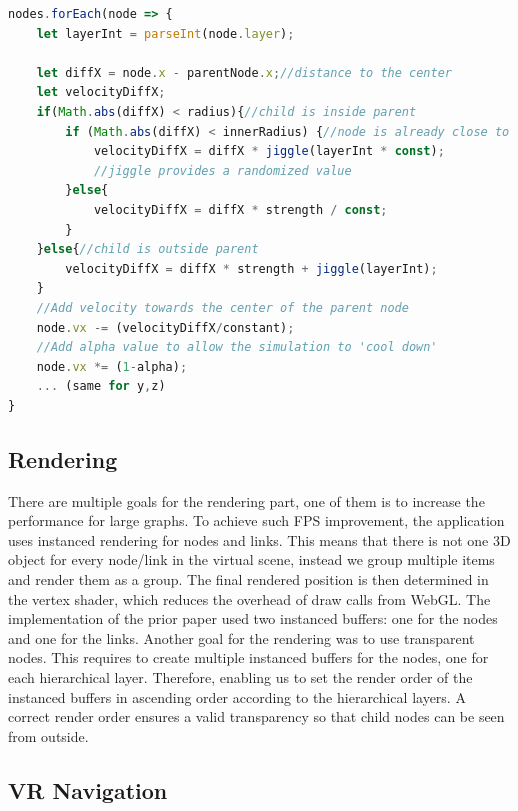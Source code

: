 \begin{lstlisting}[language=JavaScript,label={lst:sphericalConstraint},caption=Simplified algorithm for the spherical constraint. We apply adapted velocities whenever the child node is inside the parent. We further determine if the childnode is already closer to the center of the node or not.] 
nodes.forEach(node => {
    let layerInt = parseInt(node.layer);

    let diffX = node.x - parentNode.x;//distance to the center
    let velocityDiffX;
    if(Math.abs(diffX) < radius){//child is inside parent
        if (Math.abs(diffX) < innerRadius) {//node is already close to the center
            velocityDiffX = diffX * jiggle(layerInt * const);
            //jiggle provides a randomized value
        }else{
            velocityDiffX = diffX * strength / const;
        } 
    }else{//child is outside parent
        velocityDiffX = diffX * strength + jiggle(layerInt);
    }
    //Add velocity towards the center of the parent node
    node.vx -= (velocityDiffX/constant);
    //Add alpha value to allow the simulation to 'cool down'
    node.vx *= (1-alpha);
    ... (same for y,z)
}
\end{lstlisting}

\subsection{Rendering}
\label{sec:rendering}

There are multiple goals for the rendering part, one of them is to increase the performance for large graphs. 
To achieve such FPS improvement, the application uses instanced rendering for nodes and links. This means that there is not one 3D object for every node/link in the virtual scene, instead we group multiple items and render them as a group. The final rendered position is then determined in the vertex shader, which reduces the overhead of draw calls from WebGL.
The implementation of the prior paper used two instanced buffers: one for the nodes and one for the links. 
Another goal for the rendering was to use transparent nodes. This requires to create multiple instanced buffers for the nodes, one for each hierarchical layer. 
Therefore, enabling us to set the render order of the instanced buffers in ascending order according to the hierarchical layers. A correct render order ensures  a valid transparency so that child nodes can be seen from outside.

\subsection{VR Navigation}
\label{sec:vrInteractions}

